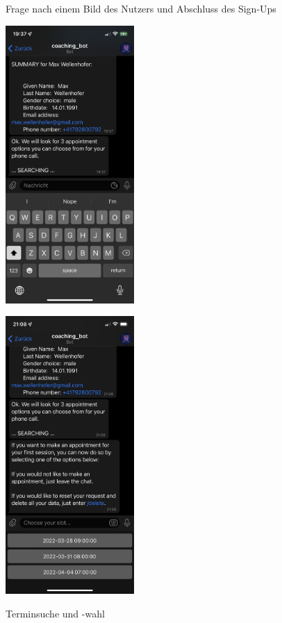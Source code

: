 \begin{figure}
\begin{minipage}{.48\linewidth}
			\caption{Frage nach einem Bild des Nutzers und Abschluss des Sign-Ups}
		\end{minipage}\quad
		\begin{minipage}{.48\linewidth}
			\centering
			{\includegraphics[width=\linewidth,height=300pt,keepaspectratio]{images/Screenshots/slot-search.PNG}}
		
			{\includegraphics[width=\linewidth,height=300pt,keepaspectratio]{images/Screenshots/appointment-selection.PNG}}
		
			\caption{Terminsuche und -wahl}
		\end{minipage}
	\end{figure}


